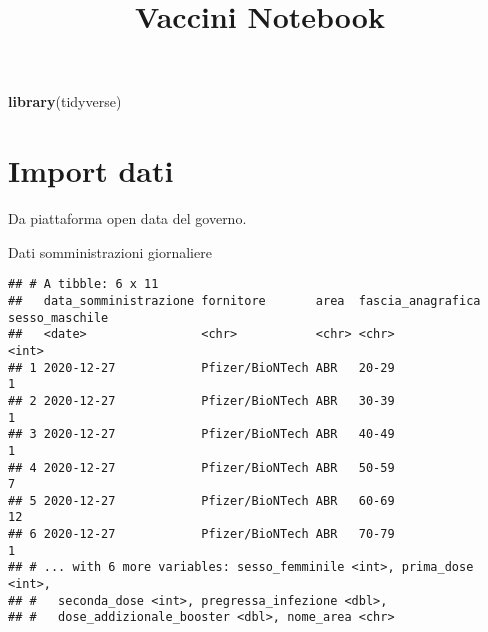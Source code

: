 \documentclass[]{article}
\title{Vaccini Notebook}
\author{}
\date{\vspace{-2.5em}}
\newenvironment{Shaded}{\begin{snugshade}}{\end{snugshade}}
\newcommand{\KeywordTok}[1]{\textcolor[rgb]{0.13,0.29,0.53}{\textbf{#1}}}
\newcommand{\DataTypeTok}[1]{\textcolor[rgb]{0.13,0.29,0.53}{#1}}
\newcommand{\StringTok}[1]{\textcolor[rgb]{0.31,0.60,0.02}{#1}}
\newcommand{\NormalTok}[1]{#1}
\begin{document}
\maketitle

\begin{Shaded}
\begin{Highlighting}[]
\KeywordTok{library}\NormalTok{(tidyverse)}
\end{Highlighting}
\end{Shaded}

\section{Import dati}\label{import-dati}

Da piattaforma open data del governo.

Dati somministrazioni giornaliere

\begin{Shaded}
\end{Shaded}

\begin{verbatim}
## # A tibble: 6 x 11
##   data_somministrazione fornitore       area  fascia_anagrafica sesso_maschile
##   <date>                <chr>           <chr> <chr>                      <int>
## 1 2020-12-27            Pfizer/BioNTech ABR   20-29                          1
## 2 2020-12-27            Pfizer/BioNTech ABR   30-39                          1
## 3 2020-12-27            Pfizer/BioNTech ABR   40-49                          1
## 4 2020-12-27            Pfizer/BioNTech ABR   50-59                          7
## 5 2020-12-27            Pfizer/BioNTech ABR   60-69                         12
## 6 2020-12-27            Pfizer/BioNTech ABR   70-79                          1
## # ... with 6 more variables: sesso_femminile <int>, prima_dose <int>,
## #   seconda_dose <int>, pregressa_infezione <dbl>,
## #   dose_addizionale_booster <dbl>, nome_area <chr>
\end{verbatim}
\end{document}
